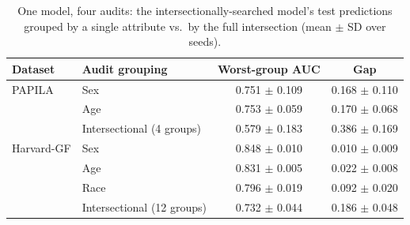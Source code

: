 \begin{table}[t]
\centering
\caption{One model, four audits: the intersectionally-searched model's test predictions grouped by a single attribute vs.\ by the full intersection (mean $\pm$ SD over seeds).}
\label{tab:audit}
\small
\begin{tabular}{llcc}
\toprule
Dataset & Audit grouping & Worst-group AUC & Gap \\
\midrule
PAPILA & Sex & 0.751 $\pm$ 0.109 & 0.168 $\pm$ 0.110 \\
 & Age & 0.753 $\pm$ 0.059 & 0.170 $\pm$ 0.068 \\
 & Intersectional (4 groups) & 0.579 $\pm$ 0.183 & 0.386 $\pm$ 0.169 \\
\midrule
Harvard-GF & Sex & 0.848 $\pm$ 0.010 & 0.010 $\pm$ 0.009 \\
 & Age & 0.831 $\pm$ 0.005 & 0.022 $\pm$ 0.008 \\
 & Race & 0.796 $\pm$ 0.019 & 0.092 $\pm$ 0.020 \\
 & Intersectional (12 groups) & 0.732 $\pm$ 0.044 & 0.186 $\pm$ 0.048 \\
\bottomrule
\end{tabular}
\end{table}
